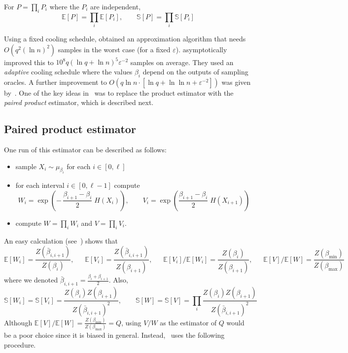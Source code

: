 \documentclass[final,12pt]{colt2018}
\def\bmin{{\beta_{\min}}}
\def\bmax{{\beta_{\max}}}
\def\E{{\mathbb E}}
\def\Vrel(#1){{{\mathbb S}[{#1}]}}
\begin{document}
\begin{lemma} For $P=\prod_i P_i$ where the $P_i$ are independent,
$$
\E[P]=\prod_i \E[P_i], \qquad \Vrel(P) = \prod_i \Vrel(P_i)
$$
\end{lemma}
 
Using a fixed cooling schedule, \cite{Bezakova08} obtained an approximation algorithm that
needs $O(q^2 (\ln n)^2)$ samples in the worst case (for a fixed $\varepsilon$). 
\cite{Stefankovic:JACM09} asymptotically improved this  to $10^8 q (\ln q + \ln n)^5\varepsilon^{-2}$ 
samples on average. They used an {\em adaptive} cooling schedule where the values
$\beta_i$ depend on the outputs of sampling oracles.
A further improvement to $O(q\ln n\cdot[\ln q + \ln \ln n+\varepsilon^{-2}])$ was given by~\cite{Huber:Gibbs}.
One of the key ideas in~\citep{Huber:Gibbs} was to replace the product estimator with
the {\em paired product} estimator, which is described next.

\subsection{Paired product estimator}
One run of this estimator can be described as follows:
\begin{itemize}
\item sample $X_i\sim\mu_{\beta_i}$ for each $i\in[0,\ell]$
\item for each interval $i\in[0,\ell-1]$ compute
$$
W_i = \exp(-\,\mbox{$\frac{\beta_{i+1}-\beta_i}2$}\; H(X_i)),\qquad 
V_i = \exp (\mbox{$\frac{\beta_{i+1}-\beta_i}2$}\;  H(X_{i+1}))
$$
\item compute $W=\prod_i W_i$ and $V=\prod_i V_i$.
\end{itemize}
An easy calculation (see~\citep{Huber:Gibbs}) shows that
$$
\E[W_i]=\frac{Z(\bar\beta_{i,i+1})}  {Z(\beta_{i})},\quad\;\;
\E[V_i]=\frac{Z(\bar\beta_{i,i+1})}{Z(\beta_{i+1})},\quad\;\;
\E[V_i]/\E[W_i] = \frac{Z(\beta_{i})}{Z(\beta_{i+1})},\quad\;\;
\E[V]/\E[W] = \frac{Z(\bmin)}{Z(\bmax)}
$$
where we denoted $\bar\beta_{i,i+1}=\frac{\beta_i+\beta_{i+1}}2$.
Also,
\begin{equation}
\Vrel(W_i)=\Vrel(V_i)=\frac{Z(\beta_i)Z(\beta_{i+1})}{Z(\bar\beta_{i,i+1})^2},\qquad
\Vrel(W)=\Vrel(V)=\prod_i \frac{Z(\beta_i)Z(\beta_{i+1})}{Z(\bar\beta_{i,i+1})^2} \label{eq:SW}
\end{equation}
%
Although $\E[V]/\E[W] = \frac{Z(\bmin)}{Z(\bmax)}=Q$, using  $V/W$ as the estimator of $Q$
would be a poor choice since it is biased in general.
Instead,~\cite{Huber:Gibbs} uses the following procedure.
\end{document}
